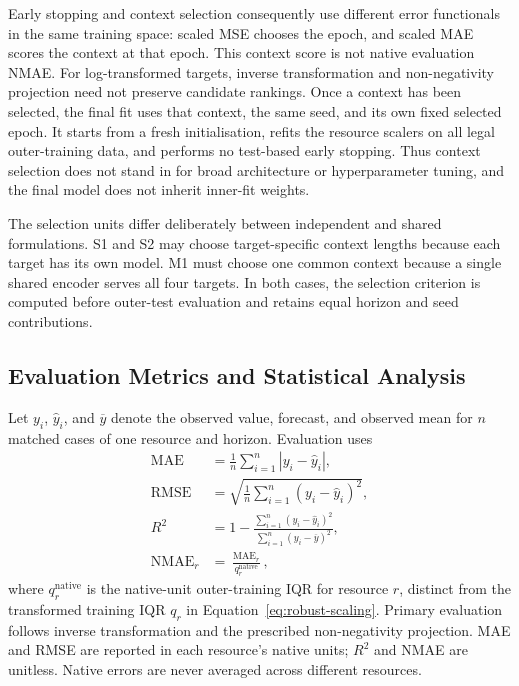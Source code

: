 \documentclass[a4paper,fleqn]{cas-dc}
\begin{document}
Early stopping and context selection consequently use different error
functionals in the same training space: scaled MSE chooses the epoch, and
scaled MAE scores the context at that epoch. This context score is not native
evaluation NMAE. For log-transformed targets, inverse transformation and
non-negativity projection need not preserve candidate rankings.
Once a context has been selected, the final fit uses that context, the
same seed, and its own fixed selected epoch.  It starts from a fresh
initialisation, refits the resource scalers on all legal outer-training data,
and performs no test-based early stopping.  Thus context selection does not
stand in for broad architecture or hyperparameter tuning, and the final model
does not inherit inner-fit weights.

The selection units differ deliberately between independent and shared
formulations.  S1 and S2 may choose target-specific context lengths because
each target has its own model.  M1 must choose one common context because a
single shared encoder serves all four targets.  In both cases, the selection
criterion is computed before outer-test evaluation and retains equal horizon
and seed contributions.

\subsection{Evaluation Metrics and Statistical Analysis}
\label{sec:evaluation}

Let $y_i$, $\widehat{y}_i$, and $\overline{y}$ denote the observed value,
forecast, and observed mean for $n$ matched cases of one resource and horizon.
Evaluation uses
\begin{equation}
  \begin{aligned}
    \operatorname{MAE} &= \frac{1}{n}\sum_{i=1}^{n}|y_i-\widehat{y}_i|, \\
    \operatorname{RMSE} &=
      \sqrt{\frac{1}{n}\sum_{i=1}^{n}(y_i-\widehat{y}_i)^2}, \\
    R^2 &= 1-
      \frac{\sum_{i=1}^{n}(y_i-\widehat{y}_i)^2}
           {\sum_{i=1}^{n}(y_i-\overline{y})^2}, \\
    \operatorname{NMAE}_r &= \frac{\operatorname{MAE}_r}{q_r^{\mathrm{native}}},
  \end{aligned}
  \label{eq:evaluation-metrics}
\end{equation}
where $q_r^{\mathrm{native}}$ is the native-unit outer-training IQR for resource
$r$, distinct from the transformed training IQR $q_r$ in
Equation~\ref{eq:robust-scaling}. Primary evaluation follows inverse
transformation and the prescribed non-negativity projection. MAE and RMSE are
reported in each resource's native units; $R^2$ and NMAE are unitless.  Native
errors are never averaged across different resources.
\end{document}
